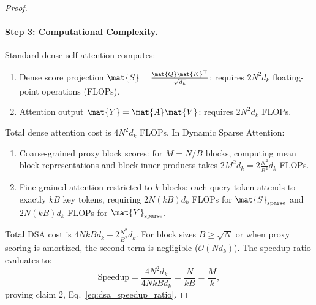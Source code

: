 \begin{proof}
\paragraph{Step 3: Computational Complexity.}
Standard dense self-attention computes:
\begin{enumerate}
    \item Dense score projection $\mat{S} = \frac{\mat{Q}\mat{K}^\top}{\sqrt{d_k}}$: requires $2 N^2 d_k$ floating-point operations (FLOPs).
    \item Attention output $\mat{Y} = \mat{A} \mat{V}$: requires $2 N^2 d_k$ FLOPs.
\end{enumerate}
Total dense attention cost is $4 N^2 d_k$ FLOPs.
In Dynamic Sparse Attention:
\begin{enumerate}
    \item Coarse-grained proxy block scores: for $M = N/B$ blocks, computing mean block representations and block inner products takes $2 M^2 d_k = 2 \frac{N^2}{B^2} d_k$ FLOPs.
    \item Fine-grained attention restricted to $k$ blocks: each query token attends to exactly $k B$ key tokens, requiring $2 N (k B) d_k$ FLOPs for $\mat{S}_{\text{sparse}}$ and $2 N (k B) d_k$ FLOPs for $\mat{Y}_{\text{sparse}}$.
\end{enumerate}
Total DSA cost is $4 N k B d_k + 2 \frac{N^2}{B^2} d_k$.
For block sizes $B \ge \sqrt{N}$ or when proxy scoring is amortized, the second term is negligible ($\mathcal{O}(N d_k)$).
The speedup ratio evaluates to:
\begin{equation}
\text{Speedup} = \frac{4 N^2 d_k}{4 N k B d_k} = \frac{N}{k B} = \frac{M}{k},
\end{equation}
proving claim 2, Eq.~\eqref{eq:dsa_speedup_ratio}.


\end{proof}
